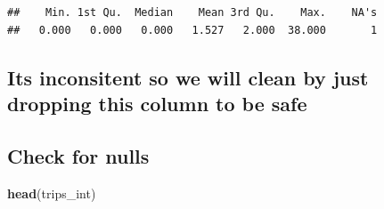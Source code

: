 \documentclass[
]{article}
\newenvironment{Shaded}{\begin{snugshade}}{\end{snugshade}}
\newcommand{\ConstantTok}[1]{\textcolor[rgb]{0.56,0.35,0.01}{#1}}
\newcommand{\FunctionTok}[1]{\textcolor[rgb]{0.13,0.29,0.53}{\textbf{#1}}}
\newcommand{\NormalTok}[1]{#1}
\newcommand{\OtherTok}[1]{\textcolor[rgb]{0.56,0.35,0.01}{#1}}
\newcommand{\SpecialCharTok}[1]{\textcolor[rgb]{0.81,0.36,0.00}{\textbf{#1}}}
\begin{document}
\begin{Shaded}
\end{Shaded}

\begin{verbatim}
##    Min. 1st Qu.  Median    Mean 3rd Qu.    Max.    NA's 
##   0.000   0.000   0.000   1.527   2.000  38.000       1
\end{verbatim}

\subsection{Its inconsitent so we will clean by just dropping this
column to be
safe}\label{its-inconsitent-so-we-will-clean-by-just-dropping-this-column-to-be-safe}

\begin{Shaded}
\end{Shaded}

\subsection{Check for nulls}\label{check-for-nulls}

\begin{Shaded}
\begin{Highlighting}[]
\FunctionTok{head}\NormalTok{(trips\_int)}
\end{Highlighting}
\end{Shaded}
\end{document}
